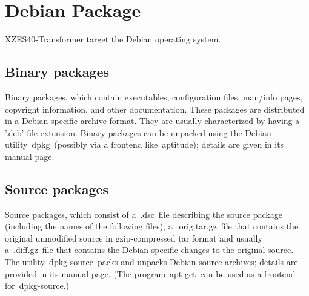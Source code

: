 \section{Debian Package}
XZES40-Transformer target the Debian operating system.
\subsection{Binary packages}
Binary packages, which contain executables, configuration files, man/info pages, copyright information, and other documentation. These packages are distributed in a Debian-specific archive format. They are usually characterized by having a '.deb' file extension. Binary packages can be unpacked using the Debian utility dpkg (possibly via a frontend like aptitude); details are given in its manual page.
\subsection{Source packages}
Source packages, which consist of a .dsc file describing the source package (including the names of the following files), a .orig.tar.gz file that contains the original unmodified source in gzip-compressed tar format and usually a .diff.gz file that contains the Debian-specific changes to the original source. The utility dpkg-source packs and unpacks Debian source archives; details are provided in its manual page. (The program apt-get can be used as a frontend for dpkg-source.)
\subsection{}
